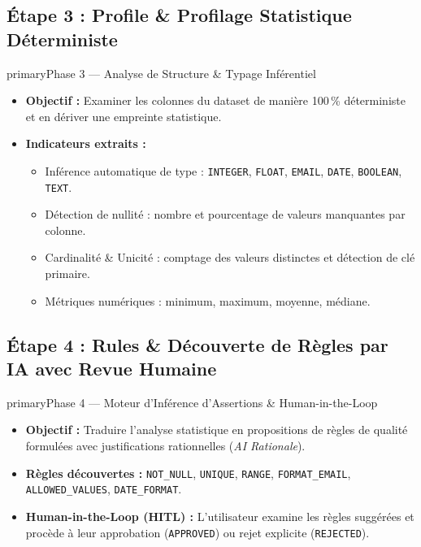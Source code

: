 \documentclass[11pt,a4paper]{article}
\begin{document}
\subsection*{Étape 3 : Profile \& Profilage Statistique Déterministe}
\begin{stepbox}{primary}{Phase 3 — Analyse de Structure \& Typage Inférentiel}
\begin{itemize}
    \item \textbf{Objectif :} Examiner les colonnes du dataset de manière 100\,\% déterministe et en dériver une empreinte statistique.
    \item \textbf{Indicateurs extraits :}
    \begin{itemize}
        \item Inférence automatique de type : \texttt{INTEGER}, \texttt{FLOAT}, \texttt{EMAIL}, \texttt{DATE}, \texttt{BOOLEAN}, \texttt{TEXT}.
        \item Détection de nullité : nombre et pourcentage de valeurs manquantes par colonne.
        \item Cardinalité \& Unicité : comptage des valeurs distinctes et détection de clé primaire.
        \item Métriques numériques : minimum, maximum, moyenne, médiane.
    \end{itemize}
\end{itemize}
\end{stepbox}

\subsection*{Étape 4 : Rules \& Découverte de Règles par IA avec Revue Humaine}
\begin{stepbox}{primary}{Phase 4 — Moteur d'Inférence d'Assertions \& Human-in-the-Loop}
\begin{itemize}
    \item \textbf{Objectif :} Traduire l'analyse statistique en propositions de règles de qualité formulées avec justifications rationnelles (\textit{AI Rationale}).
    \item \textbf{Règles découvertes :} \texttt{NOT\_NULL}, \texttt{UNIQUE}, \texttt{RANGE}, \texttt{FORMAT\_EMAIL}, \texttt{ALLOWED\_VALUES}, \texttt{DATE\_FORMAT}.
    \item \textbf{Human-in-the-Loop (HITL) :} L'utilisateur examine les règles suggérées et procède à leur approbation (\texttt{APPROVED}) ou rejet explicite (\texttt{REJECTED}).
\end{itemize}
\end{stepbox}
\end{document}
